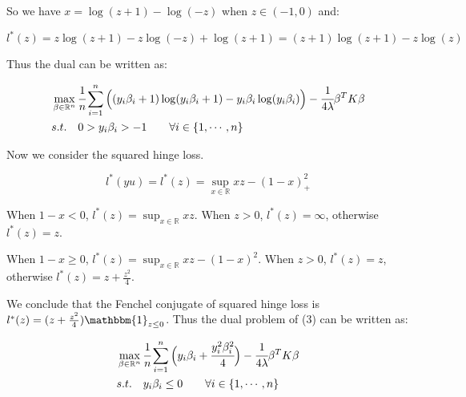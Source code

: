 \documentclass[11pt]{article}
\begin{document}
    So we have $x = \log(z+1) - \log (-z)$ when $z \in (-1, 0)$ and:

    \vspace{-2em}
    $$
    l^* (z) = z\log(z+1) - z\log(-z) + \log(z+1) = (z+1)\log(z+1) - z\log(z)
    $$
    \vspace{-3em}

    Thus the dual can be written as:

    \vspace{-4em}
    \begin{align*}
    &\max_{\beta \in \mathbb{R}^n} \cfrac{1}{n} \sum_{i=1}^n \Big((y_i\beta_i + 1) \log(y_i\beta_i + 1) - y_i \beta_i \log(y_i \beta_i) \Big) - \cfrac{1}{4 \lambda} \beta^T K \beta \\
    &s.t. \mbox{\quad} 0 > y_i \beta_i > -1 \mbox{\quad \quad} \forall i \in \{1, \cdots, n\}
    \end{align*}
    \vspace{-4em}


    Now we consider the squared hinge loss. 

    \vspace{-2em}
    $$
    l^* (yu) = l^* (z) = \sup_{x \in \mathbb{R}} xz - (1 - x)_+^2 
    $$
    \vspace{-3em}

    When $1 - x < 0$, $l^* (z) = \sup_{x \in \mathbb{R}} xz$. When $z > 0$, $l^* (z) = \infty$, otherwise $l^* (z) = z$.

    When $1 - x \ge 0$, $l^* (z) = \sup_{x \in \mathbb{R}} xz - (1-x)^2$. When $z > 0$, $l^* (z) = z$, otherwise $l^* (z) = z + \frac{z^2}{4}$.

    We conclude that the Fenchel conjugate of squared hinge loss is $l^* (z) = (z + \frac{z^2}{4}) \mathbbm{1}_{z \le 0}$. Thus the dual problem of (3) can be written as:

    \vspace{-4em}
    \begin{align*}
    &\max_{\beta \in \mathbb{R}^n} \cfrac{1}{n} \sum_{i=1}^n \Big (y_i \beta_i + \cfrac{y_i^2 \beta_i^2}{4}\Big ) - \cfrac{1}{4 \lambda} \beta^T K \beta \\
    &s.t. \mbox{\quad} y_i \beta_i \le 0  \mbox{\quad \quad} \forall i \in \{1, \cdots, n\}
    \end{align*}
    \vspace{-4em}

  
\end{document}
